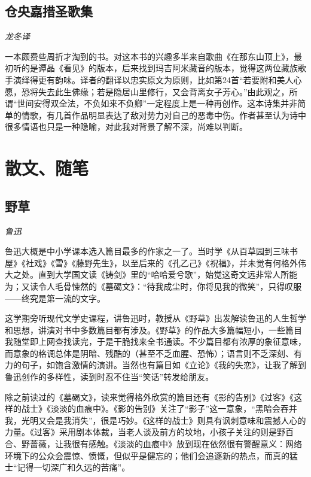 \subsection*{仓央嘉措圣歌集}
\par \emph{龙冬译} 
\par 一本颇费些周折才淘到的书。对这本书的兴趣多半来自歌曲《在那东山顶上》，最初听的是谭晶《看见》的版本，后来找到玛吉阿米藏音的版本，觉得这两位藏族歌手演绎得更有韵味。译者的翻译以忠实原文为原则，比如第24首“若要附和美人心愿，恐将失去此生佛缘；若是隐居山里修行，又会背离女子芳心。”由此观之，所谓“世间安得双全法，不负如来不负卿”一定程度上是一种再创作。这本诗集并非简单的情歌，有几首作品明显表达了敌对势力对自己的恶毒中伤。作者甚至认为诗中很多情语也只是一种隐喻，对此我对背景了解不深，尚难以判断。
\par {}

\section{散文、随笔}

\subsection*{野草}
\par \emph{鲁迅} 
\par 鲁迅大概是中小学课本选入篇目最多的作家之一了。当时学《从百草园到三味书屋》《社戏》《雪》《藤野先生》，以至后来的《孔乙己》《祝福》，并未觉有何格外伟大之处。直到大学国文读《铸剑》里的“哈哈爱兮歌”，始觉这奇文远非常人所能为；又读令人毛骨悚然的《墓碣文》：“待我成尘时，你将见我的微笑”，只得叹服——终究是第一流的文字。
\par 这学期旁听现代文学史课程，讲鲁迅时，教授从《野草》出发解读鲁迅的人生哲学和思想，讲演对书中多数篇目都有涉及。《野草》的作品大多篇幅短小，一些篇目我随堂即上网查找读完，于是干脆找来全书通读。不少篇目都有浓厚的象征意味，而意象的格调总体是阴暗、残酷的（甚至不乏血腥、恐怖）；语言则不乏深刻、有力的句子，如饱含激情的演讲。当然也有篇目如《立论》《我的失恋》，让我了解到鲁迅创作的多样性，读到时忍不住当“笑话”转发给朋友。
\par 除之前读过的《墓碣文》，读来觉得格外欣赏的篇目还有《影的告别》《过客》《这样的战士》《淡淡的血痕中》。《影的告别》关注了“影子”这一意象，“黑暗会吞并我，光明又会是我消失”，很是巧妙。《这样的战士》则具有讽刺意味和震撼人心的力量。《过客》采用剧本体裁，当老人谈及前方的坟地，小孩子关注的则是野百合、野蔷薇，让我很有感触。《淡淡的血痕中》放到现在依然很有警醒意义：网络环境下的公众会震惊、愤慨，但似乎是健忘的；他们会追逐新的热点，而真的猛士“记得一切深广和久远的苦痛”。
\par {}


